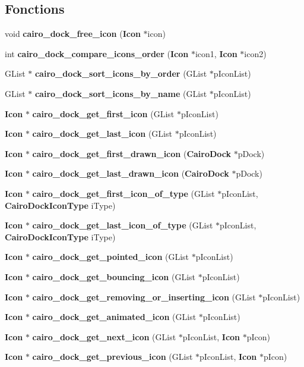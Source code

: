 \subsection*{Fonctions}
\begin{CompactItemize}
\item 
void {\bf cairo\_\-dock\_\-free\_\-icon} ({\bf Icon} $\ast$icon)
\item 
int {\bf cairo\_\-dock\_\-compare\_\-icons\_\-order} ({\bf Icon} $\ast$icon1, {\bf Icon} $\ast$icon2)
\item 
GList $\ast$ {\bf cairo\_\-dock\_\-sort\_\-icons\_\-by\_\-order} (GList $\ast$pIconList)
\item 
GList $\ast$ {\bf cairo\_\-dock\_\-sort\_\-icons\_\-by\_\-name} (GList $\ast$pIconList)
\item 
{\bf Icon} $\ast$ {\bf cairo\_\-dock\_\-get\_\-first\_\-icon} (GList $\ast$pIconList)
\item 
{\bf Icon} $\ast$ {\bf cairo\_\-dock\_\-get\_\-last\_\-icon} (GList $\ast$pIconList)
\item 
{\bf Icon} $\ast$ {\bf cairo\_\-dock\_\-get\_\-first\_\-drawn\_\-icon} ({\bf CairoDock} $\ast$pDock)
\item 
{\bf Icon} $\ast$ {\bf cairo\_\-dock\_\-get\_\-last\_\-drawn\_\-icon} ({\bf CairoDock} $\ast$pDock)
\item 
{\bf Icon} $\ast$ {\bf cairo\_\-dock\_\-get\_\-first\_\-icon\_\-of\_\-type} (GList $\ast$pIconList, {\bf CairoDockIconType} iType)
\item 
{\bf Icon} $\ast$ {\bf cairo\_\-dock\_\-get\_\-last\_\-icon\_\-of\_\-type} (GList $\ast$pIconList, {\bf CairoDockIconType} iType)
\item 
{\bf Icon} $\ast$ {\bf cairo\_\-dock\_\-get\_\-pointed\_\-icon} (GList $\ast$pIconList)
\item 
{\bf Icon} $\ast$ {\bf cairo\_\-dock\_\-get\_\-bouncing\_\-icon} (GList $\ast$pIconList)
\item 
{\bf Icon} $\ast$ {\bf cairo\_\-dock\_\-get\_\-removing\_\-or\_\-inserting\_\-icon} (GList $\ast$pIconList)
\item 
{\bf Icon} $\ast$ {\bf cairo\_\-dock\_\-get\_\-animated\_\-icon} (GList $\ast$pIconList)
\item 
{\bf Icon} $\ast$ {\bf cairo\_\-dock\_\-get\_\-next\_\-icon} (GList $\ast$pIconList, {\bf Icon} $\ast$pIcon)
\item 
{\bf Icon} $\ast$ {\bf cairo\_\-dock\_\-get\_\-previous\_\-icon} (GList $\ast$pIconList, {\bf Icon} $\ast$pIcon)
\item 

\end{CompactItemize}

